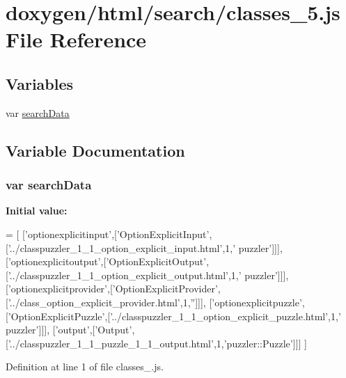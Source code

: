 \hypertarget{a00066}{}\section{doxygen/html/search/classes\+\_\+5.js File Reference}
\label{a00066}
\subsection*{Variables}
\begin{DoxyCompactItemize}
\item 
var \hyperlink{a00066_ad01a7523f103d6242ef9b0451861231e}{search\+Data}
\end{DoxyCompactItemize}


\subsection{Variable Documentation}
\hypertarget{a00066_ad01a7523f103d6242ef9b0451861231e}{}
\subsubsection[{search\+Data}]{\setlength{\rightskip}{0pt plus 5cm}var search\+Data}\label{a00066_ad01a7523f103d6242ef9b0451861231e}
{\bfseries Initial value\+:}
\begin{DoxyCode}
=
[
  [\textcolor{stringliteral}{'optionexplicitinput'},[\textcolor{stringliteral}{'OptionExplicitInput'},[\textcolor{stringliteral}{'../classpuzzler\_1\_1\_option\_explicit\_input.html'},1,\textcolor{stringliteral}{'
      puzzler'}]]],
  [\textcolor{stringliteral}{'optionexplicitoutput'},[\textcolor{stringliteral}{'OptionExplicitOutput'},[\textcolor{stringliteral}{'../classpuzzler\_1\_1\_option\_explicit\_output.html'},1,\textcolor{stringliteral}{'
      puzzler'}]]],
  [\textcolor{stringliteral}{'optionexplicitprovider'},[\textcolor{stringliteral}{'OptionExplicitProvider'},[\textcolor{stringliteral}{'../class\_option\_explicit\_provider.html'},1,\textcolor{stringliteral}{''}]]],
  [\textcolor{stringliteral}{'optionexplicitpuzzle'},[\textcolor{stringliteral}{'OptionExplicitPuzzle'},[\textcolor{stringliteral}{'../classpuzzler\_1\_1\_option\_explicit\_puzzle.html'},1,\textcolor{stringliteral}{'
      puzzler'}]]],
  [\textcolor{stringliteral}{'output'},[\textcolor{stringliteral}{'Output'},[\textcolor{stringliteral}{'../classpuzzler\_1\_1\_puzzle\_1\_1\_output.html'},1,\textcolor{stringliteral}{'puzzler::Puzzle'}]]]
]
\end{DoxyCode}


Definition at line 1 of file classes\+\_.\+js.

